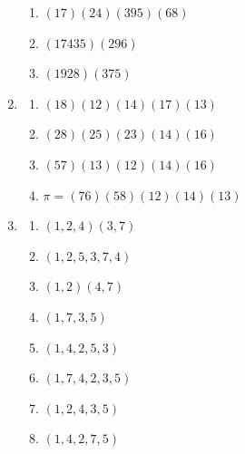 \documentclass{article}
\begin{document}
\begin{enumerate}
\begin{enumerate}[label=(\alph*)]
                \item $(17)(24)(395)(68)$

                \item $(17435)(296)$

                \item $(1928)(375)$
            \end{enumerate}

        \item
            \begin{enumerate}[label=(\alph*)]
                \item $(18)(12)(14)(17)(13)$

                \item $(28)(25)(23)(14)(16)$

                \item $(57)(13)(12)(14)(16)$

                \item $\pi = (76)(58)(12)(14)(13)$
            \end{enumerate}

        \item
            \begin{enumerate}[label=(\alph*)]
                \item $(1,2,4)(3,7)$

                \item $(1,2,5,3,7,4)$
                
                \item $(1,2)(4,7)$
                
                \item $(1,7,3,5)$
                
                \item $(1,4,2,5,3)$
                
                \item $(1,7,4,2,3,5)$
                
                \item $(1,2,4,3,5)$
                
                \item $(1,4,2,7,5)$
            \end{enumerate}


\end{enumerate}
\end{document}
